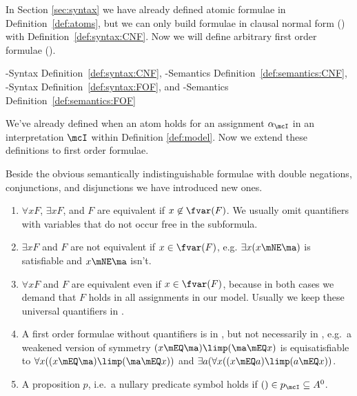 

In Section \ref{sec:syntax} we have already defined atomic formulae in Definition~\ref{def:atoms},
but we can only build formulae in clausal normal form (\CNF) with Definition~\vref{def:syntax:CNF}.
Now we will define arbitrary first order formulae (\FOF).

\CNF-Syntax Definition~\vref{def:syntax:CNF},
\CNF-Semantics Definition~\vref{def:semantics:CNF},
\FOF-Syntax Definition~\vref{def:syntax:FOF}, and
\FOF-Semantics Definition~\vref{def:semantics:FOF}



We've already defined when an atom holds for an assignment \( \alpha_\mcI \)
in an interpretation \( \mcI \) within Definition \vref{def:model}.
Now we extend these definitions to first order formulae.


%
	Beside the obvious semantically indistinguishable formulae with double negations, conjunctions, and disjunctions
	we have introduced new ones.
	\begin{enumerate}
		\item \( \forall x F \), \( \exists x F \), and \( F \) are equivalent if \( x\not\in\fvar(F) \).
		We usually omit quantifiers with variables that do not occur free in the subformula.
		\item \( \exists x F \) and \( F \) are not equivalent if \( x\in\fvar(F) \),
		e.g. \( \exists x(x\mNE\ma) \) is satisfiable and \( x\mNE\ma \) isn't.
		\item \( \forall x F \) and \( F \) are equivalent even if \( x\in\fvar(F) \),
		because in both cases we demand that \( F \) holds in all assignments in our model.
		Usually we keep these universal quantifiers in \FOF.

		\item A first order formulae without quantifiers is in ,
		but not necessarily in \CNF, e.g.~a weakened version of symmetry \( (x\mEQ \ma)\limp (\ma\mEQ x) \)
		is equisatisfiable to \( \forall x ((x\mEQ \ma)\limp (\ma\mEQ x)) \)
		and \( \exists a (\forall x ((x\mEQ a)\limp (a\mEQ x)) \).
		\item A proposition \( p \), i.e.~a nullary predicate symbol holds if \( ()\in p_\mcI \subseteq A^0 \).
	\end{enumerate}